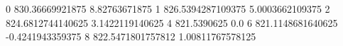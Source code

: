0 830.36669921875 8.82763671875
1 826.5394287109375 5.0003662109375
2 824.6812744140625 3.1422119140625
4 821.5390625 0.0
6 821.1148681640625 -0.4241943359375
8 822.5471801757812 1.00811767578125
